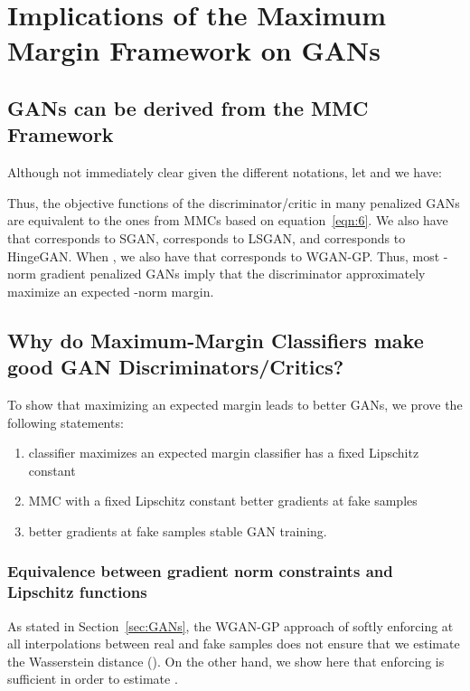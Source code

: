 \documentclass{article}
\def\eqref#1{equation~\ref{#1}}
\begin{document}
\section{Implications of the Maximum Margin Framework on GANs}
\label{sec:5}

\subsection{GANs can be derived from the MMC Framework}
\label{sec:5.1}

Although not immediately clear given the different notations, let  and we have:

Thus, the objective functions of the discriminator/critic in many penalized GANs are equivalent to the ones from MMCs based on \eqref{eqn:6}. We also have that  corresponds to SGAN,  corresponds to LSGAN, and  corresponds to HingeGAN. When , we also have that  corresponds to WGAN-GP. Thus, most -norm gradient penalized GANs imply that the discriminator approximately maximize an expected -norm margin.

\subsection{Why do Maximum-Margin Classifiers make good GAN Discriminators/Critics?}
\label{sec:5.3}

To show that maximizing an expected margin leads to better GANs, we prove the following statements:
\begin{enumerate}
    \item classifier maximizes an expected margin  classifier has a fixed Lipschitz constant
    \item MMC with a fixed Lipschitz constant  better gradients at fake samples
   \item better gradients at fake samples  stable GAN training.
\end{enumerate}

\subsubsection{Equivalence between gradient norm constraints and Lipschitz functions}
\label{sec:5.2}

As stated in Section~\ref{sec:GANs}, the WGAN-GP approach of softly enforcing  at all interpolations between real and fake samples does not ensure that we estimate the Wasserstein distance ().
On the other hand, we show here that enforcing  is sufficient in order to estimate .
\end{document}
